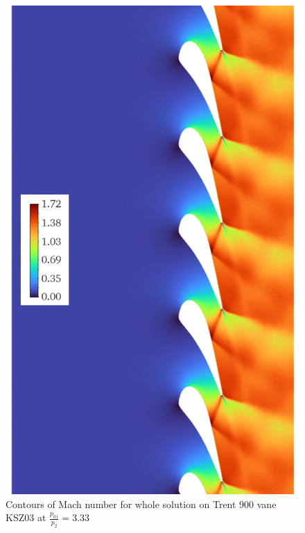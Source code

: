 \documentclass[a4paper, 11pt, oneside]{report}
\begin{document}
\begin{figure}[H]
      \centering
      \includegraphics[width=.85\textwidth]{figs/t900_mach_whole.png}
      \caption{Contours of Mach number for whole solution on Trent 900 vane KSZ03 at $\frac{p_{01}}{p_2}=3.33$}
      \label{fig:t900_mach_whole}
\end{figure}
\end{document}
